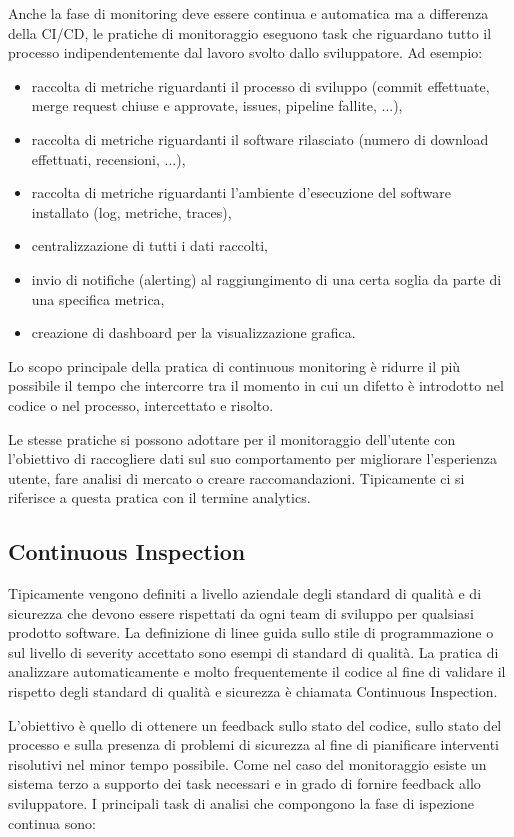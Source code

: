 Anche la fase di monitoring deve essere continua e automatica ma a differenza della CI/CD, le pratiche di monitoraggio eseguono task che riguardano tutto il processo indipendentemente dal lavoro svolto dallo sviluppatore. Ad esempio:

\begin{itemize}
    \item raccolta di metriche riguardanti il processo di sviluppo (commit effettuate, merge request chiuse e approvate, issues, pipeline fallite, ...),
    \item raccolta di metriche riguardanti il software rilasciato (numero di download effettuati, recensioni, ...),
    \item raccolta di metriche riguardanti l'ambiente d'esecuzione del software installato (log, metriche, traces),
    \item centralizzazione di tutti i dati raccolti,
    \item invio di notifiche (alerting) al raggiungimento di una certa soglia da parte di una specifica metrica,
    \item creazione di dashboard per la visualizzazione grafica.
\end{itemize}

Lo scopo principale della pratica di continuous monitoring è ridurre il più possibile il tempo che intercorre tra il momento in cui un difetto è introdotto nel codice o nel processo, intercettato e risolto.

Le stesse pratiche si possono adottare per il monitoraggio dell'utente con l'obiettivo di raccogliere dati sul suo comportamento per migliorare l'esperienza utente, fare analisi di mercato o creare raccomandazioni. Tipicamente ci si riferisce a questa pratica con il termine analytics.

\subsection{Continuous Inspection}
Tipicamente vengono definiti a livello aziendale degli standard di qualità e di sicurezza
che devono essere rispettati da ogni team di sviluppo per qualsiasi prodotto software. La
definizione di linee guida sullo stile di programmazione o sul livello di severity accettato sono esempi di standard di qualità. La pratica di analizzare automaticamente e molto frequentemente il codice al fine di validare il rispetto degli standard di qualità e sicurezza è chiamata Continuous
Inspection.

L’obiettivo è quello di ottenere un feedback sullo stato del codice, sullo stato
del processo e sulla presenza di problemi di sicurezza al fine di pianificare interventi
risolutivi nel minor tempo possibile. Come nel caso del monitoraggio esiste un sistema terzo a supporto dei task necessari e in grado di fornire feedback allo sviluppatore. I principali task di analisi che compongono la fase di ispezione continua sono:

